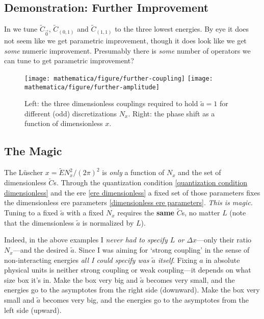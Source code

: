 \subsection{Demonstration: Further Improvement}

In  we tune $\tilde{C}_{\vec{0}}$, $\tilde{C}_{(0,1)}$ and $\tilde{C}_{(1,1)}$ to the three lowest energies.
By eye it does not seem like we get parametric improvement, though it does look like we get \emph{some} numeric improvement.
Presumably there is \emph{some} number of operators we can tune to get parametric improvement?

\begin{figure}
	\texttt{[image: mathematica/figure/further-coupling]}
	\texttt{[image: mathematica/figure/further-amplitude]}
	\caption{
		Left: the three dimensionless couplings required to hold $\tilde{a}=1$ for different (odd) discretizations $N_x$.
		Right: the phase shift as a function of dimensionless $x$.
	}
    \label{fig:tune three spheres}
\end{figure}

\subsection{The Magic}

The L\"{u}scher $x=\tilde{E} N_x^2 /(2\pi)^2$ is \emph{only} a function of $N_x$ and the set of dimensionless $\tilde{C}$s.
Through the quantization condition \eqref{quantization condition dimensionless} and the ere \eqref{ere dimensionless} a fixed set of those parameters fixes the dimensionless ere parameters \eqref{dimensionless ere parameters}.
\emph{This is magic.}
Tuning to a fixed $\tilde{a}$ with a fixed $N_x$ requires the \textbf{same} $\tilde{C}$s, no matter $L$ (note that the dimensionless $\tilde{a}$ is normalized by $L$).

Indeed, in the above examples I \emph{never had to specify $L$ or $\Delta x$}---only their ratio $N_x$---and the desired $\tilde{a}$.
Since I was aiming for `strong coupling' in the sense of non-interacting energies \emph{all I could specify was $\tilde{a}$ itself}.
Fixing $a$ in absolute physical units is neither strong coupling or weak coupling---it depends on what size box it's in.
Make the box very big and $\tilde{a}$ becomes very small, and the energies go to the asymptotes from the right side (downward).
Make the box very small and $\tilde{a}$ becomes very big, and the energies go to the asymptotes from the left  side (upward).

